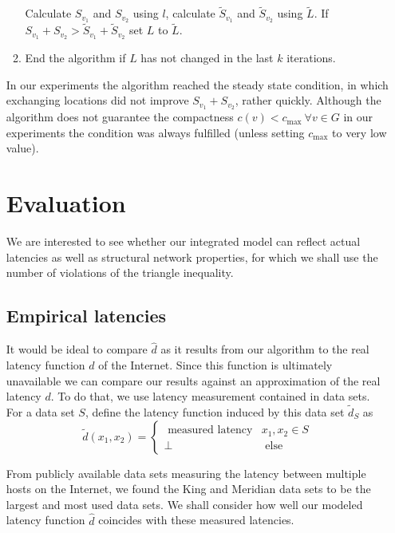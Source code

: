 \documentclass{sig-alternate-10pt}
\begin{document}
\begin{enumerate}
\begin{enumerate}
Calculate $S_{v_1}$ and $S_{v_2}$ using $l$, calculate $\tilde S_{v_1}$ and $\tilde S_{v_2}$ using $\tilde L$. If $S_{v_1} + S_{v_2} > \tilde S_{v_1} + \tilde S_{v_2}$ set $L$ to $\tilde L$. 
\item End the algorithm if $L$ has not changed in the last $k$ iterations.
\end{enumerate}
In our experiments the algorithm reached the steady state condition,  in which exchanging locations did not improve $S_{v_1} + S_{v_2}$,  rather  quickly. Although the algorithm does not guarantee the compactness $c(v) < c_{\max}\ \forall v \in G$ in our experiments the condition was always fulfilled (unless setting $c_{\max}$ to very low value). 

\section{Evaluation}
\label{sec:eval-gener-graph}

We are interested to see whether our integrated model can reflect
actual latencies as well as structural network properties, for which
we shall use the number of violations of the triangle inequality. 

\subsection{Empirical latencies}
\label{sec:empirical-latencies}

It would be ideal to compare $\hat{d}$ as it results from our algorithm to the real latency function $d$ of the Internet. Since this function is ultimately unavailable we can compare our results against an approximation of the real latency $d$. To do that, we use latency measurement contained in data sets. For a data set  $S$, define the latency function induced by this data set  $\tilde{d}_S$ as 
\[ \tilde{d}(x_1,x_2) = \begin{cases} \text{ measured latency} & x_1,x_2 \in S \\
\perp & \text{ else} \end{cases} \]

From publicly available data sets measuring the latency between multiple hosts on the Internet, we found the King \cite{IDES} and Meridian \cite{meridian} data sets to be the largest and most used data sets. 
We shall consider how well our modeled latency function $\hat d$ coincides with these measured latencies.


\end{enumerate}
\end{document}
